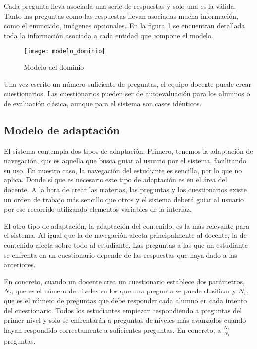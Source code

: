 Cada pregunta lleva asociada una serie de respuestas y solo una es la válida. Tanto las preguntas como las respuestas llevan asociadas mucha información, como el enunciado, imágenes opcionales\ldots En la figura \ref{fig:modelo del dominio} se encuentran detallada toda la información asociada a cada entidad que compone el modelo.

\begin{figure}[htp!]
	\centering
	\texttt{[image: modelo\_dominio]}
	\caption{Modelo del dominio}
	\label{fig:modelo del dominio}
\end{figure}

Una vez escrito un número suficiente de preguntas, el equipo docente puede crear cuestionarios. Las cuestionarios pueden ser de autoevaluación para los alumnos o de evaluación clásica, aunque para el sistema son casos idénticos.


\subsection{Modelo de adaptación}

El sistema contempla dos tipos de adaptación. Primero, tenemos la adaptación de navegación, que es aquella que busca guiar al usuario por el sistema, facilitando su uso. En nuestro caso, la navegación del estudiante es sencilla, por lo que no aplica. Donde sí que es necesario este tipo de adaptación es en el área del docente. A la hora de crear las materias, las preguntas y los cuestionarios existe un orden de trabajo más sencillo que otros y el sistema deberá guiar al usuario por ese recorrido utilizando elementos variables de la interfaz.

El otro tipo de adaptación, la adaptación del contenido, es la más relevante para el sistema. Al igual que la de navegación afecta principalmente al docente, la de contenido afecta sobre todo al estudiante. Las preguntas a las que un estudiante se enfrenta en un cuestionario depende de las respuestas que haya dado a las anteriores.

En concreto, cuando un docente crea un cuestionario establece dos parámetros, $N_l$, que es el número de niveles en los que una pregunta se puede clasificar y $N_v$, que es el número de preguntas que debe responder cada alumno en cada intento del cuestionario. Todos los estudiantes empiezan respondiendo a preguntas del primer nivel y solo se enfrentarán a preguntas de niveles más avanzados cuando hayan respondido correctamente a suficientes preguntas. En concreto, a $\frac{N_v}{N_l}$ preguntas.


